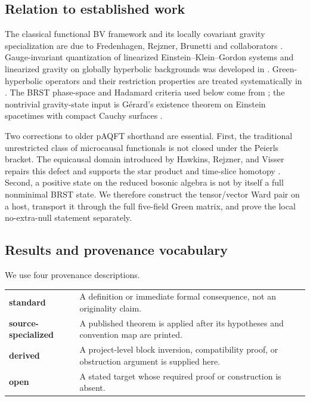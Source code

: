 \documentclass[11pt]{article}
\theoremstyle{definition}
\theoremstyle{remark}
\begin{document}
\subsection{Relation to established work}

The classical functional BV framework and its locally covariant gravity
specialization are due to Fredenhagen, Rejzner, Brunetti and collaborators
\cite{FredenhagenRejzner2012,BrunettiFredenhagenRejzner2016}.  Gauge-invariant
quantization of linearized Einstein--Klein--Gordon systems and linearized gravity on
globally hyperbolic backgrounds was developed in
\cite{Hack2014,FewsterHunt2013,HackSchenkel2013}.  Green-hyperbolic operators and
their restriction properties are treated systematically in \cite{Baer2015}.
The BRST phase-space and Hadamard criteria used below come from
\cite{WrochnaZahn2015}; the nontrivial gravity-state input is G\'erard's existence
theorem on Einstein spacetimes with compact Cauchy surfaces \cite{Gerard2023}.

Two corrections to older pAQFT shorthand are essential.  First, the traditional
unrestricted class of microcausal functionals is not closed under the Peierls bracket.
The equicausal domain introduced by Hawkins, Rejzner, and Visser repairs this defect and
supports the star product and time-slice homotopy \cite{HawkinsRejznerVisser2023}.
Second, a positive state on the reduced bosonic algebra is not by itself a full
nonminimal BRST state.  We therefore construct the tensor/vector Ward pair on a host,
transport it through the full five-field Green matrix, and prove the local
no-extra-null statement separately.

\subsection{Results and provenance vocabulary}

We use four provenance descriptions.
\begin{center}
\begin{tabularx}{0.94\textwidth}{>{\bfseries}l X}
\toprule
standard & A definition or immediate formal consequence, not an originality claim.\\
source-specialized & A published theorem is applied after its hypotheses and convention map are printed.\\
derived & A project-level block inversion, compatibility proof, or obstruction argument is supplied here.\\
open & A stated target whose required proof or construction is absent.\\
\bottomrule
\end{tabularx}
\end{center}
\end{document}

